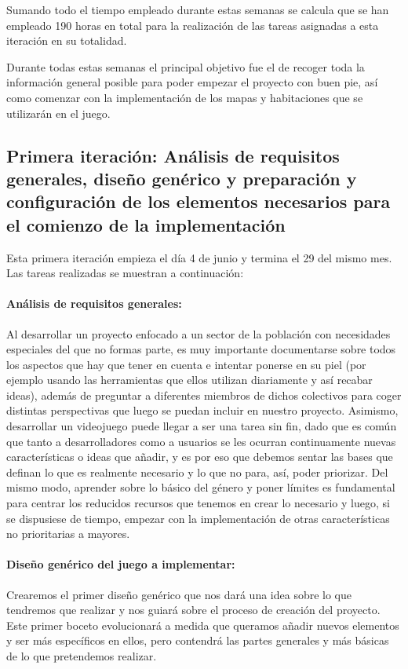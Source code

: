 Sumando todo el tiempo empleado durante estas semanas se calcula que se han empleado 190 horas en total para la realización de las tareas asignadas a esta iteración en su totalidad.

Durante todas estas semanas el principal objetivo fue el de recoger toda la información general posible para poder empezar el proyecto con buen pie, así como comenzar con la implementación de los mapas y habitaciones que se utilizarán en el juego.

\subsection{Primera iteración: Análisis de requisitos generales, diseño genérico y preparación y configuración de los elementos necesarios para el comienzo de la implementación}

Esta primera iteración empieza el día 4 de junio y termina el 29 del mismo mes. Las tareas realizadas se muestran a continuación:

\paragraph{Análisis de requisitos generales:} Al desarrollar un proyecto enfocado a un sector de la población con necesidades especiales del que no formas parte, es muy importante documentarse sobre todos los aspectos que hay que tener en cuenta e intentar ponerse en su piel (por ejemplo usando las herramientas que ellos utilizan diariamente y así recabar ideas), además de preguntar a diferentes miembros de dichos colectivos para coger distintas perspectivas que luego se puedan incluir en nuestro proyecto.
Asimismo, desarrollar un videojuego puede llegar a ser una tarea sin fin, dado que es común que tanto a desarrolladores como a usuarios se les ocurran continuamente nuevas características o ideas que añadir, y es por eso que debemos sentar las bases que definan lo que es realmente necesario y lo que no para, así, poder priorizar. 
Del mismo modo, aprender sobre lo básico del género y poner límites es fundamental para centrar los reducidos recursos que tenemos en crear lo necesario y luego, si se dispusiese de tiempo, empezar con la implementación de otras características no prioritarias a mayores.

\paragraph{Diseño genérico del juego a implementar:} Crearemos el primer diseño genérico que nos dará una idea sobre lo que tendremos que realizar y nos guiará sobre el proceso de creación del proyecto. Este primer boceto evolucionará a medida que queramos añadir nuevos elementos y ser más específicos en ellos, pero contendrá las partes generales y más básicas de lo que pretendemos realizar.


